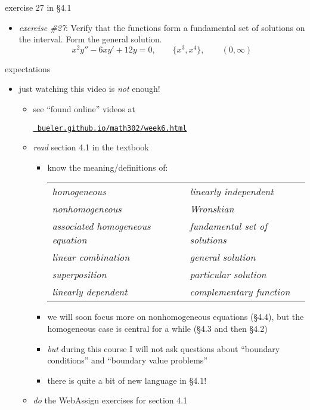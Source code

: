 \documentclass{beamer}
\begin{document}
\begin{frame}{exercise 27 in \S 4.1}

\begin{itemize}
\item \emph{exercise \#27}:  Verify that the functions form a fundamental set  of solutions on the interval.  Form the general solution.
    $$x^2 y''-6xy'+12y=0, \qquad \{x^3,x^4\}, \qquad (0,\infty)$$
\end{itemize}

\vspace{50mm}
\end{frame}


\begin{frame}{expectations}

\begin{itemize}
\item just watching this video is \emph{not} enough!
     \begin{itemize}
     \item see ``found online'' videos at

     \centerline{\href{https://bueler.github.io/math302/week6.html}{\tt \color{cyan} bueler.github.io/math302/week6.html}}
     \item \emph{read} section 4.1 in the textbook
         \begin{itemize}
         \item know the meaning/definitions of:

\bigskip
             \hspace{-10mm} \begin{tabular}{ll}
             \emph{homogeneous}                     & \emph{linearly independent} \\
             \emph{nonhomogeneous}                  & \emph{Wronskian} \\
             \emph{associated homogeneous equation} & \emph{fundamental set of solutions} \\
             \emph{linear combination}              & \emph{general solution} \\
             \emph{superposition}                   & \emph{particular solution} \\
             \emph{linearly dependent}              & \emph{complementary function}              \end{tabular}

\bigskip
         \item we will soon focus more on nonhomogeneous equations (\S4.4), but the homogeneous case is central for a while (\S4.3 and then \S4.2)
         \item \emph{but} during this course I will not ask questions about ``boundary conditions'' and ``boundary value problems''
         \item there is quite a bit of new language in \S4.1!
         \end{itemize}
     \item \emph{do} the WebAssign exercises for section 4.1
     \end{itemize}
\end{itemize}
\end{frame}
\end{document}
